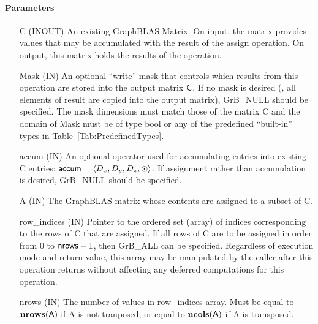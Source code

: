 \paragraph{Parameters}

\begin{itemize}[leftmargin=1in]
    \item[{\sf C}]    ({\sf INOUT}) An existing GraphBLAS Matrix.  On input,
    the matrix provides values that may be accumulated with the result of the
    assign operation.  On output, this matrix holds the results of the
    operation.

    \item[{\sf Mask}]  ({\sf IN}) An optional ``write'' mask that controls which
    results from this operation are stored into the output matrix
    ${\sf C}$.  If no mask is desired (\ie, all elements
    of result are copied into the output matrix), {\sf GrB\_NULL}
    should be specified. The mask dimensions must match those of the
    matrix {\sf C} and the domain of {\sf Mask} must be
    of type {\sf bool} or any of the predefined ``built-in'' types in
    Table~\ref{Tab:PredefinedTypes}.

    \item[{\sf accum}]    ({\sf IN}) An optional operator used for accumulating
    entries into existing {\sf C} entries: ${\sf accum} = \langle D_x,
    D_y, D_z,\odot \rangle$. If assignment rather than accumulation is
    desired, {\sf GrB\_NULL} should be specified.

    \item[{\sf A}]       ({\sf IN}) The GraphBLAS matrix whose contents are 
    assigned to a subset of {\sf C}.
    
    \item[{\sf row\_indices}]  ({\sf IN}) Pointer to the ordered set (array) of 
    indices corresponding to the rows of {\sf C} that are assigned.  If all rows
    of {\sf C} are to be assigned in order from $0$ to ${\sf nrows} - 1$, then 
    {\sf GrB\_ALL} can be specified.  Regardless of execution mode and return 
    value, this array may be manipulated by the caller after this operation 
    returns without affecting any deferred computations for this operation.
    
    \item[{\sf nrows}] ({\sf IN}) The number of values in {\sf row\_indices} 
	array. Must be equal to $\bold{nrows}({\sf A})$ if {\sf A} is not tranposed,
	or equal to $\bold{ncols}({\sf A})$ if {\sf A} is transposed.


\end{itemize}
